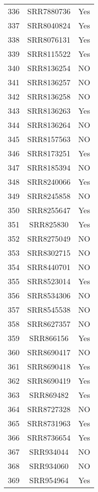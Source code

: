 \begin{longtable}{ccc}
  336 & SRR7880736 & Yes \\ 
  337 & SRR8040824 & Yes \\ 
  338 & SRR8076131 & Yes \\ 
  339 & SRR8115522 & Yes \\ 
  340 & SRR8136254 & NO \\ 
  341 & SRR8136257 & NO \\ 
  342 & SRR8136258 & NO \\ 
  343 & SRR8136263 & Yes \\ 
  344 & SRR8136264 & NO \\ 
  345 & SRR8157563 & NO \\ 
  346 & SRR8173251 & Yes \\ 
  347 & SRR8185394 & NO \\ 
  348 & SRR8240066 & Yes \\ 
  349 & SRR8245858 & NO \\ 
  350 & SRR8255647 & Yes \\ 
  351 & SRR825830 & Yes \\ 
  352 & SRR8275049 & NO \\ 
  353 & SRR8302715 & NO \\ 
  354 & SRR8440701 & NO \\ 
  355 & SRR8523014 & Yes \\ 
  356 & SRR8534306 & NO \\ 
  357 & SRR8545538 & NO \\ 
  358 & SRR8627357 & NO \\ 
  359 & SRR866156 & Yes \\ 
  360 & SRR8690417 & NO \\ 
  361 & SRR8690418 & Yes \\ 
  362 & SRR8690419 & Yes \\ 
  363 & SRR869482 & Yes \\ 
  364 & SRR8727328 & NO \\ 
  365 & SRR8731963 & Yes \\ 
  366 & SRR8736654 & Yes \\ 
  367 & SRR934044 & NO \\ 
  368 & SRR934060 & NO \\ 
  369 & SRR954964 & Yes \\ 
   \hline
\end{longtable}
